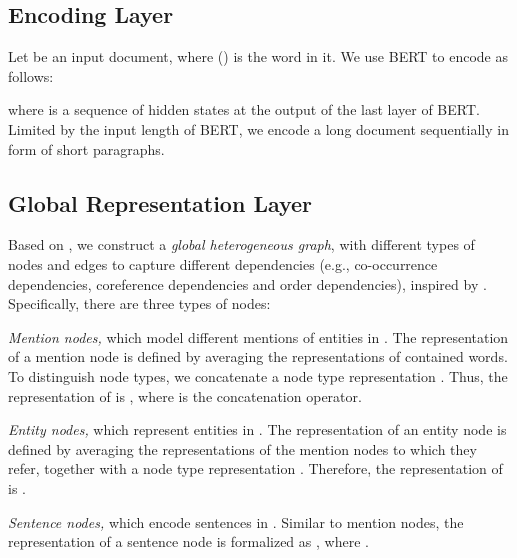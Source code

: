 \documentclass[11pt,a4paper]{article}
\begin{document}
\subsection{Encoding Layer}

Let  be an input document, where  () is the  word in it. We use BERT to encode  as follows:

where  is a sequence of hidden states at the output of the last layer of BERT. Limited by the input length of  BERT, we encode a long document sequentially in form of short paragraphs.

\subsection{Global Representation Layer}

Based on , we construct a \emph{global heterogeneous graph}, with different types of nodes and edges to capture different dependencies (e.g., co-occurrence dependencies, coreference dependencies and order dependencies), inspired by \citet{christopoulou2019connecting}. 
Specifically, there are three types of nodes:
\begin{compactitem}
\item \emph{Mention nodes,} which model different mentions of entities in . The representation of a mention node  is defined by averaging the representations of contained words. To distinguish node types, we concatenate a node type representation . Thus, the representation of  is , where  is the concatenation operator.

\item \emph{Entity nodes,} which represent entities in . The representation of an entity node  is defined by averaging the representations of the mention nodes to which they refer, together with a node type representation . Therefore, the representation of  is .

\item \emph{Sentence nodes,} which encode sentences in . Similar to mention nodes, the representation of a sentence node  is formalized as , where .
\end{compactitem}
\end{document}
